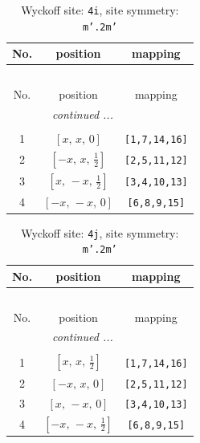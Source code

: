 \documentclass[fleqn,8pt]{jsarticle}
\begin{document}
\renewcommand{\arraystretch}{1.2}
\begin{longtable}{ccc}
\caption{Wyckoff site: {\tt 4i}, site symmetry: {\tt m'.2m'}}
 \\
 \hline \hline
No. & position & mapping \\ \hline \endfirsthead

\multicolumn{2}{l}{\tablename\ \thetable{}} \\
 \hline \hline
No. & position & mapping \\ \hline \endhead

 \hline \hline
\multicolumn{2}{r}{\footnotesize\it continued ...} \\ \endfoot

 \hline \hline
\multicolumn{2}{r}{} \\ \endlastfoot

1 & $\left[ x,\, x,\, 0 \right]$ & {\tt [1,7,14,16]} \\ \hline
2 & $\left[ - x,\, x,\, \frac{1}{2} \right]$ & {\tt [2,5,11,12]} \\ \hline
3 & $\left[ x,\, - x,\, \frac{1}{2} \right]$ & {\tt [3,4,10,13]} \\ \hline
4 & $\left[ - x,\, - x,\, 0 \right]$ & {\tt [6,8,9,15]} \\
\end{longtable}
\renewcommand{\arraystretch}{1.2}
\begin{longtable}{ccc}
\caption{Wyckoff site: {\tt 4j}, site symmetry: {\tt m'.2m'}}
 \\
 \hline \hline
No. & position & mapping \\ \hline \endfirsthead

\multicolumn{2}{l}{\tablename\ \thetable{}} \\
 \hline \hline
No. & position & mapping \\ \hline \endhead

 \hline \hline
\multicolumn{2}{r}{\footnotesize\it continued ...} \\ \endfoot

 \hline \hline
\multicolumn{2}{r}{} \\ \endlastfoot

1 & $\left[ x,\, x,\, \frac{1}{2} \right]$ & {\tt [1,7,14,16]} \\ \hline
2 & $\left[ - x,\, x,\, 0 \right]$ & {\tt [2,5,11,12]} \\ \hline
3 & $\left[ x,\, - x,\, 0 \right]$ & {\tt [3,4,10,13]} \\ \hline
4 & $\left[ - x,\, - x,\, \frac{1}{2} \right]$ & {\tt [6,8,9,15]} \\
\end{longtable}
\end{document}
